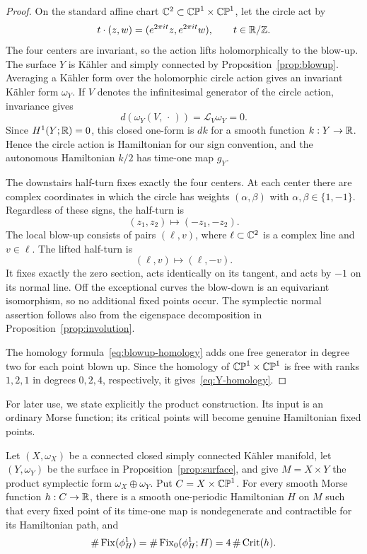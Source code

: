 \begin{proof}
On the standard affine chart $\mathbb C^2\subset\mathbb{CP}^1\times\mathbb{CP}^1$, let the circle act by
\[
  t\cdot(z,w)=(e^{2\pi it}z,e^{2\pi it}w),
  \qquad t\in\mathbb R/\mathbb Z.
\]
The four centers are invariant, so the action lifts holomorphically to
the blow-up.  The surface $Y$ is K\"ahler and simply connected by
Proposition~\ref{prop:blowup}.  Averaging a K\"ahler form over the
holomorphic circle action gives an invariant K\"ahler form $\omega_Y$.
If $V$ denotes the infinitesimal generator of the circle action, invariance
gives
\[
  d(\omega_Y(V,\,\cdot\,))=\mathcal L_V\omega_Y=0.
\]
Since $H^1(Y;\mathbb R)=0$, this closed one-form is $dk$ for a smooth function
$k:Y\to\mathbb R$.  Hence the circle action is Hamiltonian for our sign
convention, and the autonomous Hamiltonian $k/2$ has time-one map $g_Y$.

The downstairs half-turn fixes exactly the four centers.  At each center
there are complex coordinates in which the circle has weights
$(\alpha,\beta)$ with $\alpha,\beta\in\{1,-1\}$.  Regardless of these
signs, the half-turn is
\[
  (z_1,z_2)\longmapsto(-z_1,-z_2).
\]
The local blow-up consists of pairs $(\ell,v)$, where $\ell\subset\mathbb C^2$ is
a complex line and $v\in\ell$.  The lifted half-turn is
\[
  (\ell,v)\longmapsto(\ell,-v).
\]
It fixes exactly the zero section, acts identically on its tangent, and
acts by $-1$ on its normal line.  Off the exceptional curves the blow-down
is an equivariant isomorphism, so no additional fixed points occur.  The
symplectic normal assertion follows also from the eigenspace decomposition
in Proposition~\ref{prop:involution}.

The homology formula~\eqref{eq:blowup-homology} adds one free generator in
degree two for each point blown up.  Since the homology of
$\mathbb{CP}^1\times\mathbb{CP}^1$ is free with ranks $1,2,1$ in degrees $0,2,4$,
respectively, it gives~\eqref{eq:Y-homology}.
\end{proof}

For later use, we state explicitly the product construction.  Its input
is an ordinary Morse function; its critical points will become genuine
Hamiltonian fixed points.

\begin{corollary}\label{cor:product-realization}
Let $(X,\omega_X)$ be a connected closed simply connected K\"ahler manifold,
let $(Y,\omega_Y)$ be the surface in Proposition~\ref{prop:surface}, and give
$M=X\times Y$ the product symplectic form
$\omega_X\oplus\omega_Y$.  Put $C=X\times\mathbb{CP}^1$.
For every smooth Morse function $h:C\to\mathbb R$, there is a smooth one-periodic
Hamiltonian $H$ on $M$ such that every fixed point of its time-one map is
nondegenerate and contractible for its Hamiltonian path, and
\[
  \#\operatorname{Fix}(\phi_H^1)=\#\operatorname{Fix}_0(\phi_H^1;H)
       =4\,\#\operatorname{Crit}(h).
\]
\end{corollary}

